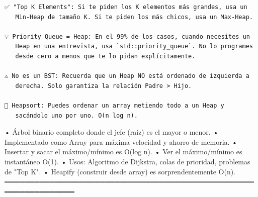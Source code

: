 \begin{lstlisting}
✅ "Top K Elements": Si te piden los K elementos más grandes, usa un
   Min-Heap de tamaño K. Si te piden los más chicos, usa un Max-Heap.

💡 Priority Queue = Heap: En el 99% de los casos, cuando necesites un 
   Heap en una entrevista, usa `std::priority_queue`. No lo programes
   desde cero a menos que te lo pidan explícitamente.

⚠️ No es un BST: Recuerda que un Heap NO está ordenado de izquierda a
   derecha. Solo garantiza la relación Padre > Hijo.

🔑 Heapsort: Puedes ordenar un array metiendo todo a un Heap y 
   sacándolo uno por uno. O(n log n).
\end{lstlisting}

\begin{dsaresumen}

• Árbol binario completo donde el jefe (raíz) es el mayor o menor.
• Implementado como Array para máxima velocidad y ahorro de memoria.
• Insertar y sacar el máximo/mínimo es O(log n).
• Ver el máximo/mínimo es instantáneo O(1).
• Usos: Algoritmo de Dijkstra, colas de prioridad, problemas de "Top K".
• Heapify (construir desde array) es sorprendentemente O(n).
════════════════════════════════════════════════════════════════

\end{dsaresumen}


